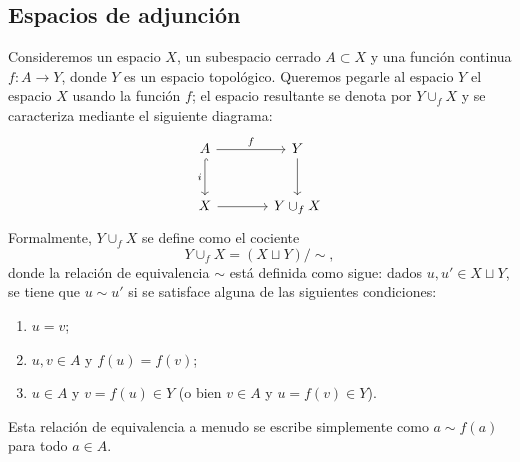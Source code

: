 \subsection{Espacios de adjunción}

Consideremos un espacio $X$, un subespacio cerrado $A \subset X$ y una función continua $f \colon A \to Y$, donde $Y$ es un espacio topológico. Queremos pegarle al espacio $Y$ el espacio $X$ usando la función $f$; el espacio resultante se denota por $Y \cup_f X$ y se caracteriza mediante el siguiente diagrama:
\[
\begin{tikzcd}[row sep=large, column sep=large]
A \arrow[r, "f"] \arrow[d, "i"', hook] & Y \arrow[d] \\
X \arrow[r] & Y \cup_f X
\end{tikzcd}
\]
Formalmente, $Y \cup_f X$ se define como el cociente
\[
Y \cup_f X = (X \sqcup Y) / {\sim},
\]
donde la relación de equivalencia $\sim$ está definida como sigue: dados $u, u' \in X \sqcup Y$, se tiene que $u \sim u'$ si se satisface alguna de las siguientes condiciones:
\begin{enumerate}[label=\arabic*)]
    \item $u = v$;
    \item $u,v\in A$ y $f(u) = f(v)$;
    \item $u\in A$ y $v = f(u) \in Y$ (o bien $v\in A$ y $u = f(v) \in Y$).
\end{enumerate}

\begin{nota}
Esta relación de equivalencia a menudo se escribe simplemente como $a \sim f(a)$ para todo $a \in A$.
\end{nota}

